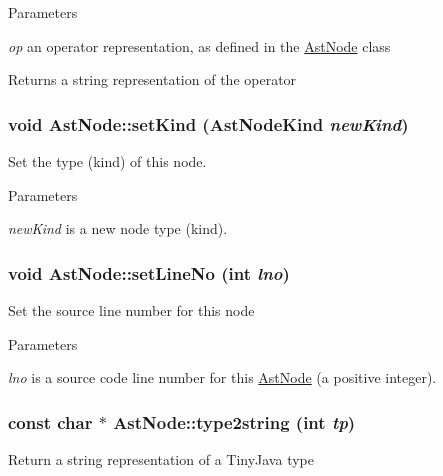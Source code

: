 \begin{DoxyParams}{Parameters}
\item[{\em op}]an operator representation, as defined in the \hyperlink{classAstNode}{AstNode} class\end{DoxyParams}
\begin{DoxyReturn}{Returns}
a string representation of the operator 
\end{DoxyReturn}
\hypertarget{classAstNode_a1d7bf9b1d9cd668d155ddd86d22bc727}{
\subsubsection[{setKind}]{\setlength{\rightskip}{0pt plus 5cm}void AstNode::setKind ({\bf AstNodeKind} {\em newKind})}}
\label{classAstNode_a1d7bf9b1d9cd668d155ddd86d22bc727}
Set the type (kind) of this node. 
\begin{DoxyParams}{Parameters}
\item[{\em newKind}]is a new node type (kind). \end{DoxyParams}
\hypertarget{classAstNode_abe694eb81a2d9042c571ecc2ca8d38e8}{
\subsubsection[{setLineNo}]{\setlength{\rightskip}{0pt plus 5cm}void AstNode::setLineNo (int {\em lno})}}
\label{classAstNode_abe694eb81a2d9042c571ecc2ca8d38e8}
Set the source line number for this node 
\begin{DoxyParams}{Parameters}
\item[{\em lno}]is a source code line number for this \hyperlink{classAstNode}{AstNode} (a positive integer). \end{DoxyParams}
\hypertarget{classAstNode_a6b77773e4a27d8ca40bc1fce09d4764e}{
\subsubsection[{type2string}]{\setlength{\rightskip}{0pt plus 5cm}const char $\ast$ AstNode::type2string (int {\em tp})}}
\label{classAstNode_a6b77773e4a27d8ca40bc1fce09d4764e}
Return a string representation of a TinyJava type


